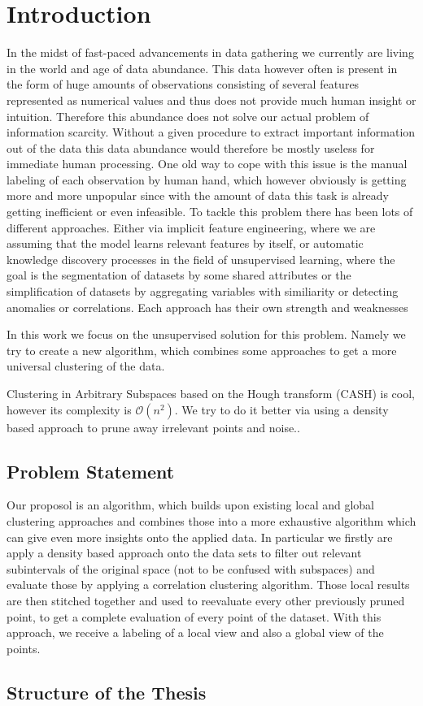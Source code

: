 \chapter{Introduction}

In the midst of fast-paced advancements in data gathering we currently are living in the world and age of data abundance. This data however often is present in the form of huge amounts of observations consisting of several features represented as numerical values and thus does not provide much human insight or intuition. Therefore this abundance does not solve our actual problem of information scarcity. Without a given procedure to extract important information out of the data this data abundance would therefore be mostly useless for immediate human processing. One old way to cope with this issue is the manual labeling of each observation by human hand, which however obviously is getting more and more unpopular since with the amount of data this task is already getting inefficient or even infeasible. %
To tackle this problem there has been lots of different approaches. Either via implicit feature engineering, where we are assuming that the model learns relevant features by itself, or automatic knowledge discovery processes in the field of unsupervised learning, where the goal is  the segmentation of datasets by some shared attributes or the simplification of datasets by aggregating variables with similiarity or detecting anomalies or correlations. Each approach has their own strength and weaknesses

In this work we focus on the unsupervised solution for this problem. Namely we try to create a new algorithm, which combines some approaches to get a more universal clustering of the data.

Clustering in Arbitrary Subspaces based on the Hough transform (CASH) is cool, however its complexity is $\mathcal{O}(n^2)$.
We try to do it better via using a density based approach to prune away irrelevant points and noise..

\section{Problem Statement}
Our proposol is an algorithm, which builds upon existing local and global clustering approaches and combines those into a more exhaustive algorithm which can give even more insights onto the applied data. In particular we firstly are apply a density based approach onto the data sets to filter out relevant subintervals of the original space (not to be confused with subspaces) and evaluate those by applying a correlation clustering algorithm. Those local results are then stitched together and used to reevaluate every other previously pruned point, to get a complete evaluation of every point of the dataset. With this approach, we receive a labeling of a local view and also a global view of the points. 

\section{Structure of the Thesis}
